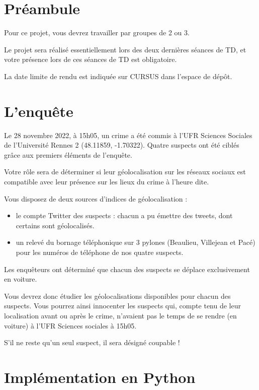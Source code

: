 \documentclass[11pt,a4paper]{article}
\begin{document}
\section{Préambule}

Pour ce projet, vous devrez travailler par groupes de 2 ou 3.

Le projet sera réalisé essentiellement lors des deux dernières séances de TD, et votre présence lors de ces séances de TD est obligatoire.

La date limite de rendu est indiquée sur CURSUS dans l’espace de dépôt.


\section{L'enquête}

Le 28 novembre 2022, à 15h05, un crime a été commis à l’UFR Sciences Sociales de l’Université Rennes 2 (48.11859, -1.70322). Quatre suspects ont été ciblés grâce aux premiers éléments de l’enquête. 

Votre rôle sera de déterminer si leur géolocalisation sur les réseaux sociaux est compatible avec leur présence sur les lieux du crime à l’heure dite.

Vous disposez de deux sources d'indices de géolocalisation : 
\begin{itemize}
    \item le compte Twitter des suspects : chacun a pu émettre des tweets, dont certains sont géolocalisés. 
    \item un relevé du bornage téléphonique sur 3 pylones (Beaulieu, Villejean et Pacé) pour les numéros de téléphone de nos quatre suspects.
\end{itemize}

Les enquêteurs ont déterminé que chacun des suspects se déplace exclusivement en voiture. 

Vous devrez donc étudier les géolocalisations disponibles pour chacun des suspects. Vous pourrez ainsi innocenter les suspects qui, compte tenu de leur localisation avant ou après le crime, n'avaient pas le temps de se rendre (en voiture) à l'UFR Sciences sociales à 15h05. 

S'il ne reste qu'un seul suspect, il sera désigné coupable !

\section{Implémentation en Python}
\end{document}
